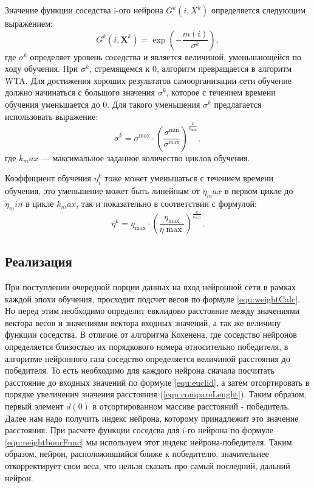 Значение функции соседства i-ого нейрона $G^k(i,X^k)$ определяется следующим выражением:
\begin{equation}\label{equ:neightbourFunc}
G ^ { k } \left( i , \mathbf { X } ^ { k } \right) = \exp \left( - \frac { m ( i ) } { \sigma ^ { k } } \right),
\end{equation}
где $\sigma ^k$ определяет уровень соседства и является величиной, уменьшающейся по ходу обучения. При $\sigma ^k$, стремящемся к 0, алгоритм превращается в алгоритм WTA. Для достижения хороших результатов самоорганизации сети обучение должно начинаться с большого значения $\sigma ^k$, которое с течением времени обучения уменьшается до 0. Для такого уменьшения $\sigma ^k$ предлагается использовать выражение:
\begin{equation}\label{equ:sigma}
    \sigma ^ { k } = \sigma ^ { \max } \cdot \left( \frac { \sigma ^ { \min } } { \sigma ^ { \max } } \right) ^ { \frac { k } { k _ { \max } } },
\end{equation}
где $k_max$ — максимальное заданное количество циклов обучения.

Коэффициент обучения $\eta_i^k$ тоже может уменьшаться с течением времени обучения, это уменьшение может быть линейным от $\eta_max$ в первом цикле до $\eta_min$ в цикле $k_max$, так и показательно в соответствии с формулой:
\begin{equation}\label{equ:eta}
    \eta ^ { k } = \eta _ { \max } \cdot \left( \frac { \eta _ { \max } } { \eta \max } \right) ^ { \frac { k } { k _ { \max } } }.
\end{equation}


\subsection{Реализация}

При поступлении очередной порции данных на вход нейронной сети в рамках каждой эпохи обучения, просходит подсчет весов по формуле \ref{equ:weightCalc}. Но перед этим необходимо определит евклидово расстояние между значениями вектора весов и значениями вектора входных значений, а так же величину функции соседства. В отличие от алгоритма Кохенена, где соседство нейронов определяется близостью их порядкового номера относительно победителя, в алгоритме нейронного газа соседство определяется величиной расстояния до победителя. То есть необходимо для каждого нейрона сначала посчитать расстояние до входных значений по формуле \ref{equ:euclid}, а затем отсортировать в порядке увеличенич значения расстояния (\ref{equ:compareLenght}). Таким образом, первый элемент $d(0)$ в отсортированном массиве расстояний - победитель. Далее нам надо получить индекс нейрона, которому принадлежит это значение расстояния. При расчете функции соседсва для i-го нейрона по формуле \ref{equ:neightbourFunc} мы используем этот индекс нейрона-победителя. Таким образом, нейрон, расположившийся ближе к победителю, значительнее откорректирует свои веса, что нельзя сказать про самый последний, дальний нейрон.

